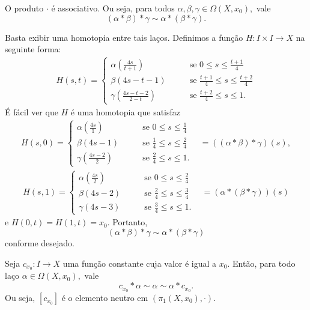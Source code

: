 \begin{lemma}
    O produto $\cdot$ é associativo. Ou seja, para todos $\alpha,\beta,\gamma\in\Omega(X,x_0),$ vale
    \[(\alpha*\beta)*\gamma\sim \alpha*(\beta*\gamma).\]
\end{lemma}

\begin{dem}
    Basta exibir uma homotopia entre tais laços. Definimos a função $H:I\times I\rightarrow X$ na seguinte forma:
    \begin{align*}
        H(s,t)=\begin{cases}
            \alpha(\frac{4s}{t+1})\;\;\;&\;\;\;\mbox{ se }0\le s \le \frac{t+1}{4}\\
            \beta(4s-t-1)\;\;\;&\;\;\;\mbox{ se }\frac{t+1}{4}\le s\le\frac{t+2}{4}\\
            \gamma(\frac{4s-t-2}{2-t})\;\;\;&\;\;\;\mbox{ se }\frac{t+2}{4}\le s\le 1.
        \end{cases}
    \end{align*}
    É fácil ver que $H$ é uma homotopia que satisfaz
    \begin{align*}
        H(s,0)=\begin{cases}
            \alpha(\frac{4s}{1})\;\;\;&\;\;\;\mbox{ se }0\le s \le \frac{1}{4}\\
            \beta(4s-1)\;\;\;&\;\;\;\mbox{ se }\frac{1}{4}\le s\le\frac{2}{4}\\
            \gamma(\frac{4s-2}{2})\;\;\;&\;\;\;\mbox{ se }\frac{2}{4}\le s\le 1.
        \end{cases}\;\;\;=((\alpha*\beta)*\gamma)(s),
    \end{align*}
    \begin{align*}
        H(s,1)=\begin{cases}
            \alpha(\frac{4s}{2})\;\;\;&\;\;\;\mbox{ se }0\le s \le \frac{2}{4}\\
            \beta(4s-2)\;\;\;&\;\;\;\mbox{ se }\frac{2}{4}\le s\le\frac{3}{4}\\
            \gamma(4s-3)\;\;\;&\;\;\;\mbox{ se }\frac{3}{4}\le s\le 1.
        \end{cases}\;\;\;=(\alpha*(\beta*\gamma))(s)
    \end{align*}
    e $H(0,t)=H(1,t)=x_0.$ Portanto, $$(\alpha*\beta)*\gamma\sim \alpha*(\beta*\gamma)$$ conforme desejado.
\end{dem}

\begin{lemma}
    Seja $c_{x_0}:I\rightarrow X$ uma função constante cuja valor é igual a $x_0.$ Então, para todo laço $\alpha\in \Omega(X,x_0),$ vale
    $$c_{x_0}*\alpha\sim\alpha\sim\alpha*c_{x_0}.$$
    Ou seja, $[c_{x_0}]$ é o elemento neutro em $(\pi_1(X,x_0),\cdot)$.
\end{lemma}

